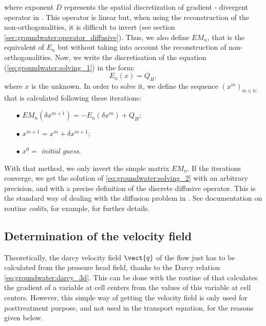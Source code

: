 where exponent $D$ represents the spatial discretization of gradient - divergent operator in \CS. This operator is linear but, when using
the reconstruction of the non-orthogonalities, it is difficult to invert (see section \ref{sec:groundwater:operator_diffusive}).
Thus, we also define $EM_n$, that is the equivalent of $E_n$ but without taking into account the reconstruction of non-orthogonalities.
Now, we write the discretisation of the equation (\ref{eq:groundwater:solving_1}) in the form:
\begin{equation}
\label{eq:groundwater:solving_2}
E_n(x) = Q_H,
\end{equation}
where $x$ is the unknown. In order to solve it, we define the sequence $(x^m)_{m \in \mathbb{N}}$
that is calculated following these iterations:
\begin{itemize}
 \item[$\bullet$] $EM_n(\delta x^{m+1}) = - E_n(\delta x^{m}) + Q_H$;
 \item[$\bullet$] $x^{m+1} = x^m + \delta x^{m+1}$;
 \item[$\bullet$] $x^0 =$ \textit{initial guess}.
\end{itemize}
With that method, we only invert the simple matrix $EM_n$. If the iterations converge, we get the solution of \eqref{eq:groundwater:solving_2}
with an arbitrary precision, and with a precise definition of the discrete diffusive operator. This is the standard way
of dealing with the diffusion problem in \CS.
See documentation on routine \textit{codits}, for example, for further details.

\subsection{Determination of the velocity field}
\label{velocity_field}
Theoretically, the darcy velocity field $\vect{q}$ of the flow just has to be calculated from the pressure head field, thanks to the Darcy relation
\eqref{eq:groundwater:darcy_3d}. This can be done with the routine of \CS that calculates the gradient of a variable at cell centers from the values of this
variable at cell centers.
However, this simple way of getting the velocity field is only used for posttreatment purpose,
and not used in the transport equation, for the reasons given below.

